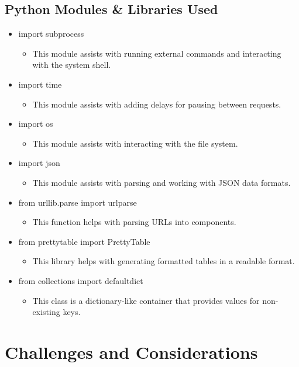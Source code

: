 \documentclass[12pt]{article}
\begin{document}
\subsection*{Python Modules \& Libraries Used}
\begin{itemize}
    \item import subprocess
    \begin{itemize}
        \item This module assists with running external commands and interacting with the system shell.
    \end{itemize}
    \item import time
    \begin{itemize}
        \item This module assists with adding delays for pausing between requests.
    \end{itemize}
    \item import os
    \begin{itemize}
        \item This module assists with interacting with the file system.
    \end{itemize}
    \item import json
    \begin{itemize}
        \item This module assists with parsing and working with JSON data formats.
    \end{itemize}
    \item from urllib.parse import urlparse
    \begin{itemize}
        \item This function helps with parsing URLs into components.
    \end{itemize}
    \item from prettytable import PrettyTable
    \begin{itemize}
        \item This library helps with generating formatted tables in a readable format.
    \end{itemize}
    \item from collections import defaultdict
    \begin{itemize}
        \item This class is a dictionary-like container that provides values for non-existing keys.
    \end{itemize}
\end{itemize}


\section*{Challenges and Considerations}
\end{document}
